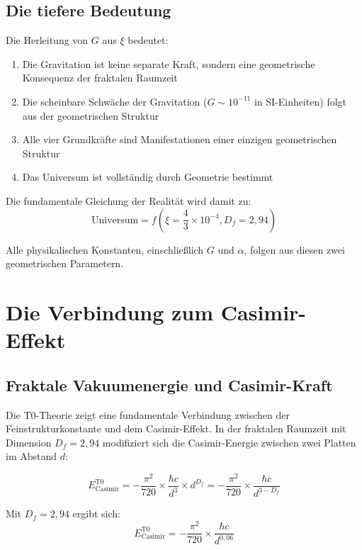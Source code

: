 \documentclass[12pt,a4paper]{article}
\theoremstyle{definition}
\begin{document}
	\subsection{Die tiefere Bedeutung}
	
	Die Herleitung von $G$ aus $\xi$ bedeutet:
	
	\begin{enumerate}
		\item Die Gravitation ist keine separate Kraft, sondern eine geometrische Konsequenz der fraktalen Raumzeit
		\item Die scheinbare Schwäche der Gravitation ($G \sim 10^{-11}$ in SI-Einheiten) folgt aus der geometrischen Struktur
		\item Alle vier Grundkräfte sind Manifestationen einer einzigen geometrischen Struktur
		\item Das Universum ist vollständig durch Geometrie bestimmt
	\end{enumerate}
	
	Die fundamentale Gleichung der Realität wird damit zu:
	\begin{equation}
		\boxed{\text{Universum} = f\left(\xi = \frac{4}{3} \times 10^{-4}, D_f = 2{,}94\right)}
	\end{equation}
	
	Alle physikalischen Konstanten, einschließlich $G$ und $\alpha$, folgen aus diesen zwei geometrischen Parametern.
	
	\section{Die Verbindung zum Casimir-Effekt}
	
	\subsection{Fraktale Vakuumenergie und Casimir-Kraft}
	
	Die T0-Theorie zeigt eine fundamentale Verbindung zwischen der Feinstrukturkonstante und dem Casimir-Effekt. In der fraktalen Raumzeit mit Dimension $D_f = 2{,}94$ modifiziert sich die Casimir-Energie zwischen zwei Platten im Abstand $d$:
	
	\begin{equation}
		E_{\text{Casimir}}^{\text{T0}} = -\frac{\pi^2}{720} \times \frac{\hbar c}{d^3} \times d^{D_f} = -\frac{\pi^2}{720} \times \frac{\hbar c}{d^{3-D_f}}
	\end{equation}
	
	Mit $D_f = 2{,}94$ ergibt sich:
	\begin{equation}
		E_{\text{Casimir}}^{\text{T0}} = -\frac{\pi^2}{720} \times \frac{\hbar c}{d^{0{,}06}}
	\end{equation}
	
\end{document}
